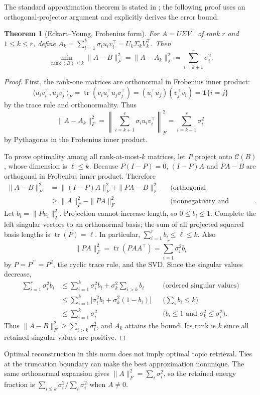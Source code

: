 \documentclass[11pt]{article}
\newtheorem{theorem}{Theorem}
\newcommand{\rank}{\operatorname{rank}}
\newcommand{\tr}{\operatorname{tr}}
\begin{document}
The standard approximation theorem is stated in \cite{ey}; the following proof
uses an orthogonal-projector argument and explicitly derives the error bound.
\begin{theorem}[Eckart--Young, Frobenius form]
For $A=U\Sigma V^\top$ of rank $r$ and $1\le k\le r$, define
$A_k=\sum_{i=1}^k\sigma_i u_iv_i^\top=U_k\Sigma_kV_k^\top$. Then
\[
\min_{\rank(B)\le k}\|A-B\|_F^2
=\|A-A_k\|_F^2=\sum_{i=k+1}^{r}\sigma_i^2.
\]
\end{theorem}
\begin{proof}
First, the rank-one matrices are orthonormal in Frobenius inner product:
\[
\langle u_iv_i^\top,u_jv_j^\top\rangle_F
=\tr(v_iu_i^\top u_jv_j^\top)
=(u_i^\top u_j)(v_j^\top v_i)=\mathbf1\{i=j\}
\]
by the trace rule and orthonormality. Thus
\[
\|A-A_k\|_F^2
=\left\|\sum_{i=k+1}^{r}\sigma_i u_iv_i^\top\right\|_F^2
=\sum_{i=k+1}^{r}\sigma_i^2
\]
by Pythagoras in the Frobenius inner product.

To prove optimality among all rank-at-most-$k$ matrices, let $P$ project onto
$\mathcal C(B)$, whose dimension is $\ell\le k$. Because $P(I-P)=0$,
$(I-P)A$ and $PA-B$ are orthogonal in Frobenius inner product. Therefore
\begin{align*}
\|A-B\|_F^2&=\|(I-P)A\|_F^2+\|PA-B\|_F^2
&&\text{(orthogonal decomposition)}\\
&\ge\|A\|_F^2-\|PA\|_F^2
&&\text{(nonnegativity and Pythagoras)}.
\end{align*}
Let $b_i=\|Pu_i\|_2^2$. Projection cannot increase length, so $0\le b_i\le1$.
Complete the left singular vectors to an orthonormal basis; the sum of all
projected squared basis lengths is $\tr(P)=\ell$. In particular,
$\sum_{i=1}^r b_i\le\ell\le k$. Also
\[
\|PA\|_F^2=\tr(PAA^\top)=\sum_{i=1}^r\sigma_i^2b_i
\]
by $P=P^\top=P^2$, the cyclic trace rule, and the SVD. Since the singular values
decrease,
\begin{align*}
\sum_{i=1}^r\sigma_i^2b_i
&\le\sum_{i=1}^k\sigma_i^2b_i+\sigma_k^2\sum_{i>k}b_i
&&\text{(ordered singular values)}\\
&\le\sum_{i=1}^k\bigl[\sigma_i^2b_i+\sigma_k^2(1-b_i)\bigr]
&&\text{($\sum_i b_i\le k$)}\\
&\le\sum_{i=1}^k\sigma_i^2
&&\text{($b_i\le1$ and $\sigma_k^2\le\sigma_i^2$)}.
\end{align*}
Thus $\|A-B\|_F^2\ge\sum_{i>k}\sigma_i^2$, and $A_k$ attains the bound.
Its rank is $k$ since all retained singular values are positive.
\end{proof}
Optimal reconstruction in this norm does not imply optimal topic retrieval.
Ties at the truncation boundary can make the best approximation nonunique.
The same orthonormal expansion gives $\|A\|_F^2=\sum_i\sigma_i^2$, so the
retained energy fraction is $\sum_{i\le k}\sigma_i^2/\sum_i\sigma_i^2$ when $A\ne0$.
\end{document}

